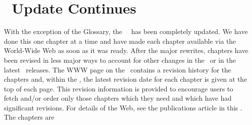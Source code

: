 \section{\Cookbook\ Update Continues}

     With the exception of the Glossary, the \AIPS\ \Cookbook\ has
been completely updated.  We have done this one chapter at a time and
have made each chapter available via the World-Wide Web as soon as it
was ready.  After the major rewrites, chapters have been revised in
less major ways to account for other changes in the \Cookbook\ or in
the latest \AIPS\ releases.  The WWW page on the \Cookbook\ contains a
revision history for the chapters and, within the \Cookbook, the
latest revision date for each chapter is given at the top of each
page.  This revision information is provided to encourage users to
fetch and/or order only those chapters which they need and which have
had significant revisions.  For details of the Web, see the
publications article in this \Aipsletter.  The chapters are
\vfill\eject
